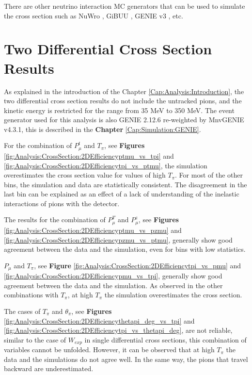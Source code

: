 There are other neutrino interaction MC generators that can be used to simulate the cross section such as NuWro \cite{juszczak2009runningnuwro}, GiBUU \cite{GiBUU}, GENIE v3 \cite{GENIE:2021npt}, etc.


\pagebreak

\section{Two Differential Cross Section Results}
\label{Cap:xSec:2DResults}

As explained in the introduction of the Chapter \ref{Cap:Analysis:Introduction}, the two differential cross section results do not include the untracked pions, and the kinetic energy is restricted for the range from 35 MeV to 350 MeV. The event generator used for this analysis is also GENIE 2.12.6 re-weighted by MnvGENIE v4.3.1, this is described in the \textbf{Chapter} \ref{Cap:Simulation:GENIE}. 

For the combination of $P^t_\mu$ and $T_\pi$, see \textbf{Figures} \ref{fig:Analysis:CrossSection:2DEfficiencyptmu_vs_tpi} and \ref{fig:Analysis:CrossSection:2DEfficiencytpi_vs_ptmu}, the simulation overestimates the cross section value for values of high $T_\pi$. For most of the other bins, the simulation and data are statistically consistent. The disagreement in the last bin can be explained as an effect of a lack of understanding of the inelastic interactions of pions with the detector.


The results for the combination of $P^T_\mu$ and $P^z_\mu$, see \textbf{Figures} \ref{fig:Analysis:CrossSection:2DEfficiencyptmu_vs_pzmu} and \ref{fig:Analysis:CrossSection:2DEfficiencypzmu_vs_ptmu}, generally show good agreement between the data and the simulation, even for bins with low statistics. 

$P_\mu$ and $T_\pi$, see \textbf{Figure} \ref{fig:Analysis:CrossSection:2DEfficiencytpi_vs_pmu} and \ref{fig:Analysis:CrossSection:2DEfficiencypmu_vs_tpi}, generally show good agreement between the data and the simulation. As observed in the other combinations with $T_\pi$, at high $T_\pi$ the simulation overestimates the cross section.  


The cases of $T_\pi$ and $\theta_\pi$, see \textbf{Figures} \ref{fig:Analysis:CrossSection:2DEfficiencythetapi_deg_vs_tpi} and \ref{fig:Analysis:CrossSection:2DEfficiencytpi_vs_thetapi_deg},  are not reliable, similar to the case of $W_{exp}$ in single differential cross sections, this combination of variables cannot be unfolded. However, it can be observed that at high $T_\pi$ the data and the simulations do not agree well. In the same way, the pions that travel backward are underestimated. 

